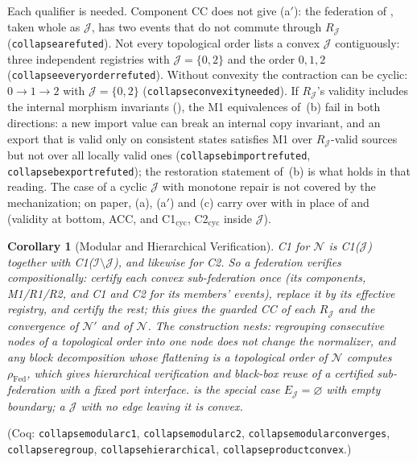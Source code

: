 \documentclass[11pt,a4paper]{article}
\theoremstyle{plain}
\newtheorem{corollary}[theorem]{Corollary}
\theoremstyle{definition}
\theoremstyle{remark}
\newcommand{\Fed}{\mathrm{Fed}}
\renewcommand{\_}{\textunderscore\allowbreak}
\begin{document}
Each qualifier is needed.  Component CC does not give (a$'$): the federation
of , taken whole as $\mathcal{J}$, has two events that do not
commute through $R_{\mathcal{J}}$ (\texttt{collapse\_a\_refuted}).  Not every
topological order lists a convex $\mathcal{J}$ contiguously: three independent
registries with $\mathcal{J} = \{0, 2\}$ and the order $0, 1, 2$
(\texttt{collapse\_every\_order\_refuted}).  Without convexity the contraction
can be cyclic: $0 \to 1 \to 2$ with $\mathcal{J} = \{0, 2\}$
(\texttt{collapse\_convexity\_needed}).  If $R_{\mathcal{J}}$'s validity
includes the internal morphism invariants (), the M1
equivalences of~(b) fail in both directions: a new import value can break an
internal copy invariant, and an export that is valid only on consistent states
satisfies M1 over $R_{\mathcal{J}}$-valid sources but not over all locally valid
ones (\texttt{collapse\_b\_import\_refuted},
\texttt{collapse\_b\_export\_refuted}); the restoration statement of~(b) is
what holds in that reading.  The case of a cyclic $\mathcal{J}$ with monotone
repair is not covered by the mechanization; on paper, (a), (a$'$) and (c) carry
over with  in place of
 and  (validity at
bottom, ACC, and C1$_{\mathrm{cyc}}$, C2$_{\mathrm{cyc}}$ inside
$\mathcal{J}$).

\begin{corollary}[Modular and Hierarchical Verification]
\label{cor:modular}
C1 for $\mathcal{N}$ is C1($\mathcal{J}$) together with
C1($\mathcal{I} \setminus \mathcal{J}$), and likewise for C2.  So a federation
verifies compositionally: certify each convex sub-federation once (its
components, M1/R1/R2, and C1 and C2 for its members' events), replace it by its
effective registry, and certify the rest; this gives the guarded CC of each
$R_{\mathcal{J}}$ and the convergence of $\mathcal{N}'$ and of $\mathcal{N}$.
The construction nests: regrouping consecutive nodes of a topological order into
one node does not change the normalizer, and any block decomposition whose
flattening is a topological order of $\mathcal{N}$ computes $\rho_\Fed$, which
gives hierarchical verification and black-box reuse of a certified
sub-federation with a fixed port interface.   is the special
case $E_{\mathcal{J}} = \varnothing$ with empty boundary; a $\mathcal{J}$ with
no edge leaving it is convex.
\end{corollary}

(Coq: \texttt{collapse\_modular\_c1}, \texttt{collapse\_modular\_c2},
\texttt{collapse\_modular\_converges}, \texttt{collapse\_regroup},
\texttt{collapse\_hierarchical}, \texttt{collapse\_product\_convex}.)
\end{document}
